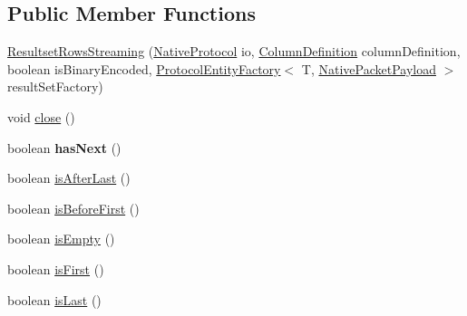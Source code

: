 \subsection*{Public Member Functions}
\begin{DoxyCompactItemize}
\item 
\mbox{\hyperlink{classcom_1_1mysql_1_1cj_1_1protocol_1_1a_1_1result_1_1_resultset_rows_streaming_a2fd06d15f9d59ed1e807189b556357f4}{Resultset\+Rows\+Streaming}} (\mbox{\hyperlink{classcom_1_1mysql_1_1cj_1_1protocol_1_1a_1_1_native_protocol}{Native\+Protocol}} io, \mbox{\hyperlink{interfacecom_1_1mysql_1_1cj_1_1protocol_1_1_column_definition}{Column\+Definition}} column\+Definition, boolean is\+Binary\+Encoded, \mbox{\hyperlink{interfacecom_1_1mysql_1_1cj_1_1protocol_1_1_protocol_entity_factory}{Protocol\+Entity\+Factory}}$<$ T, \mbox{\hyperlink{classcom_1_1mysql_1_1cj_1_1protocol_1_1a_1_1_native_packet_payload}{Native\+Packet\+Payload}} $>$ result\+Set\+Factory)
\item 
void \mbox{\hyperlink{classcom_1_1mysql_1_1cj_1_1protocol_1_1a_1_1result_1_1_resultset_rows_streaming_ae16b87b06548b980f3b0e3d9df020296}{close}} ()
\item 
\mbox{\label{classcom_1_1mysql_1_1cj_1_1protocol_1_1a_1_1result_1_1_resultset_rows_streaming_aaa49f432c3992ae2bbe56bbc4c273fb8}} 
boolean {\bfseries has\+Next} ()
\item 
boolean \mbox{\hyperlink{classcom_1_1mysql_1_1cj_1_1protocol_1_1a_1_1result_1_1_resultset_rows_streaming_a87d9941d48a1d379d2387082904ebe6c}{is\+After\+Last}} ()
\item 
boolean \mbox{\hyperlink{classcom_1_1mysql_1_1cj_1_1protocol_1_1a_1_1result_1_1_resultset_rows_streaming_aea0a6d7632abca3ff7a6f6d69412c011}{is\+Before\+First}} ()
\item 
boolean \mbox{\hyperlink{classcom_1_1mysql_1_1cj_1_1protocol_1_1a_1_1result_1_1_resultset_rows_streaming_a477080ab4c378e7bf32d5c1230ecedbe}{is\+Empty}} ()
\item 
boolean \mbox{\hyperlink{classcom_1_1mysql_1_1cj_1_1protocol_1_1a_1_1result_1_1_resultset_rows_streaming_a723004a61b6ca61f2da79c7876c62502}{is\+First}} ()
\item 
boolean \mbox{\hyperlink{classcom_1_1mysql_1_1cj_1_1protocol_1_1a_1_1result_1_1_resultset_rows_streaming_abe926437ff8f266271a0e2403404dbc4}{is\+Last}} ()
\item 
\mbox{\label{classcom_1_1mysql_1_1cj_1_1protocol_1_1a_1_1result_1_1_resultset_rows_streaming_a2150a98917c9542a703991059ebd369f}} 

\end{DoxyCompactItemize}
